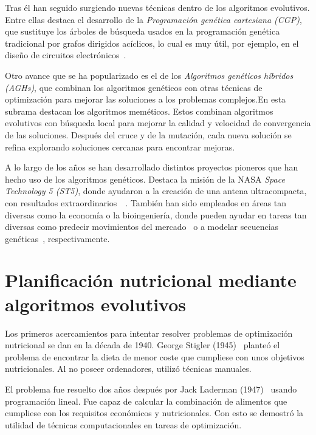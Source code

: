 Tras él han seguido surgiendo nuevas técnicas dentro de los algoritmos evolutivos. Entre ellas destaca el desarrollo de la \textit{Programación genética cartesiana (CGP)}, que sustituye los árboles de búsqueda usados en la programación genética tradicional por grafos dirigidos acíclicos, lo cual es muy útil, por ejemplo, en el diseño de circuitos electrónicos~\cite{miller2000}.

Otro avance que se ha popularizado es el de los \textit{Algoritmos genéticos híbridos (AGHs)}, que combinan los algoritmos genéticos con otras técnicas de optimización para mejorar las soluciones a los problemas complejos.\newpage En esta subrama destacan los algoritmos meméticos. Estos combinan algoritmos evolutivos con búsqueda local para mejorar la calidad y velocidad de convergencia de las soluciones. Después del cruce y de la mutación, cada nueva solución se refina explorando soluciones cercanas para encontrar mejoras.~\cite{moscato2003}

A lo largo de los años se han desarrollado distintos proyectos pioneros que han hecho uso de los algoritmos genéticos. Destaca la misión de la NASA \textit{Space Technology 5 (ST5)}, donde ayudaron a la creación de una antena ultracompacta, con resultados extraordinarios~\cite{nasa2006}~\cite{lohn2004}. También han sido empleados en áreas tan diversas como la economía o la bioingeniería, donde pueden ayudar en tareas tan diversas como predecir movimientos del mercado~\cite{abraham2022} o a modelar secuencias genéticas~\cite{notredame1996}, respectivamente.

\section{Planificación nutricional mediante algoritmos evolutivos}

Los primeros acercamientos para intentar resolver problemas de optimización nutricional se dan en la década de 1940. George Stigler (1945)~\cite{stigler1945} planteó el problema de encontrar la dieta de menor coste que cumpliese con unos objetivos nutricionales. Al no poseer ordenadores, utilizó técnicas manuales.

El problema fue resuelto dos años después por Jack Laderman (1947)~\cite{problemasdedietas} usando programación lineal. Fue capaz de calcular la combinación de alimentos que cumpliese con los requisitos económicos y nutricionales. Con esto se demostró la utilidad de técnicas computacionales en tareas de optimización.

